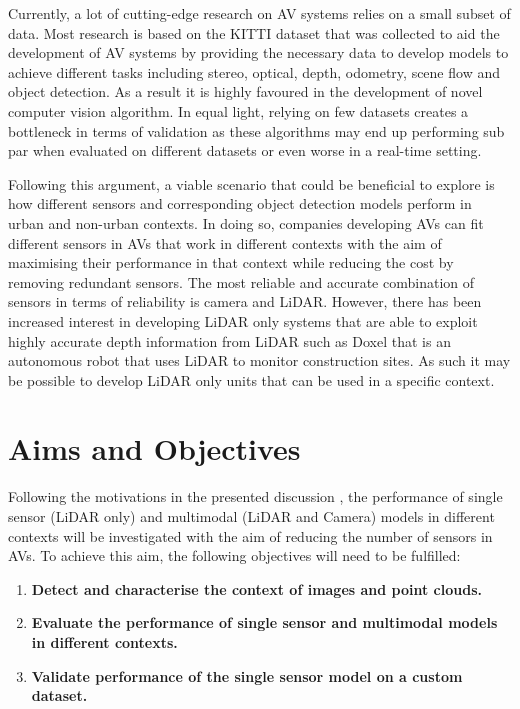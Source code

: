 Currently, a lot of cutting-edge research on AV systems relies on a small subset of data. Most research is based on the  KITTI dataset \cite{Geiger2012CVPR} that was collected to aid the development of AV systems by providing the necessary data to develop models to achieve different tasks including stereo, optical, depth, odometry, scene flow and object detection. As a result it is highly favoured in the development of novel computer vision algorithm. 
In equal light, relying on few datasets creates a bottleneck in terms of validation as these algorithms may end up performing sub par when evaluated on different datasets or even worse in a real-time setting. 

Following this argument, a viable scenario that could be beneficial to explore is how different sensors and corresponding object detection models perform in urban and non-urban contexts. In doing so, companies developing AVs can fit different sensors in AVs that work in different contexts with the aim of maximising their performance in that context while reducing the cost by removing redundant sensors. The most reliable and accurate combination of sensors in terms of reliability is camera and LiDAR. However, there has been increased interest in developing LiDAR only systems that are able to exploit highly accurate depth information from LiDAR such as Doxel\cite{doxel} that is an autonomous robot that uses LiDAR to monitor construction sites. As such it may be possible to develop LiDAR only units that can be used in a specific context. 

\section{Aims and Objectives}
Following the motivations in the presented discussion , the performance of single sensor (LiDAR only) and multimodal (LiDAR and Camera) models in different contexts will be investigated with the aim of reducing the number of sensors in AVs.
To achieve this aim, the following objectives will need to be fulfilled:
\begin{enumerate}
	\item \textbf{Detect and characterise the context of images and point clouds.}
	\item \textbf{Evaluate the performance of single sensor and multimodal models in different contexts. }
	\item \textbf{Validate performance of the single sensor model on a custom dataset.}
\end{enumerate}

